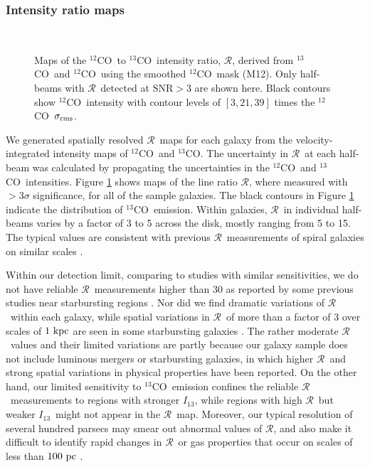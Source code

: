 \documentclass{emulateapj}
\def\ttco{\mbox{$^{13}$CO}}
\def\twco{\mbox{$^{12}$CO}}
\def\rtt{$\mathcal{R}$}
\def\un{\rm \ }
\def\itt{$I_{13}$}
\begin{document}
 \subsubsection{Intensity ratio maps}
 
\begin{figure*}[ht]
\hspace{0.2cm}
\\
\caption{
Maps of the \twco \ to \ttco \ intensity ratio, \rtt, 
derived from \ttco \ and \twco \ using the smoothed 
\twco \ mask (M12). 
Only half-beams with \rtt \ detected at $\mathrm{SNR} > 3$ 
are shown here.
Black contours show \twco \ intensity with contour levels of 
$[3, 21, 39]$ times the \twco \ $\sigma_{\rm rms}$.} 
\label{fig:ratio}
\end{figure*}
 
We generated spatially resolved \rtt \ maps for each galaxy from the velocity-integrated intensity maps of \twco \ and
\ttco. 
The uncertainty in \rtt \ at each half-beam was calculated
by propagating the uncertainties in the
\twco \ and \ttco \ intensities.
Figure \ref{fig:ratio} shows maps of the line ratio \rtt, where
measured with $> 3\sigma$ significance, for all of the sample
galaxies. 
The black contours in Figure \ref{fig:ratio} indicate the distribution of \ttco \ emission. 
Within galaxies, \rtt \ in individual half-beams varies by a factor of 3 to 5 
across the disk, mostly ranging from 5 to 15.  
The typical values are consistent with previous \rtt \ measurements of
spiral galaxies on similar scales \citep[e.g.][]{Hirota2010, Pety2013}.
 
Within our detection limit, comparing to studies with similar sensitivities, we do not have reliable \rtt \ measurements higher than $30$ as
reported by some previous studies near starbursting regions 
\citep{Huttemeister2000, Aalto2010}.    
Nor did we find dramatic variations of \rtt \ within each galaxy,
while spatial variations in \rtt \ of more than a factor of 3  
over scales of $ 1 \un kpc$ are seen in some starbursting galaxies
\citep{Huttemeister2000, Aalto2010, Meier2004}.
The rather moderate \rtt \ values and their limited variations  
are partly because our galaxy sample does not include luminous mergers or
starbursting galaxies,  in which higher \rtt \ and
strong spatial variations in physical properties have been reported.
On the other hand, our limited sensitivity to \ttco  \ emission  
confines the reliable \rtt \ measurements to regions with stronger \itt, 
while regions with high \rtt \ but weaker \itt \ might not appear in the \rtt \ map.  
Moreover, our typical resolution of several hundred parsecs may smear out
abnormal values of \rtt, and also make it difficult to identify   
rapid changes in \rtt \  or gas properties that occur on
scales of less than $100\un pc$ \citep{Meier2004}.   
\end{document}
